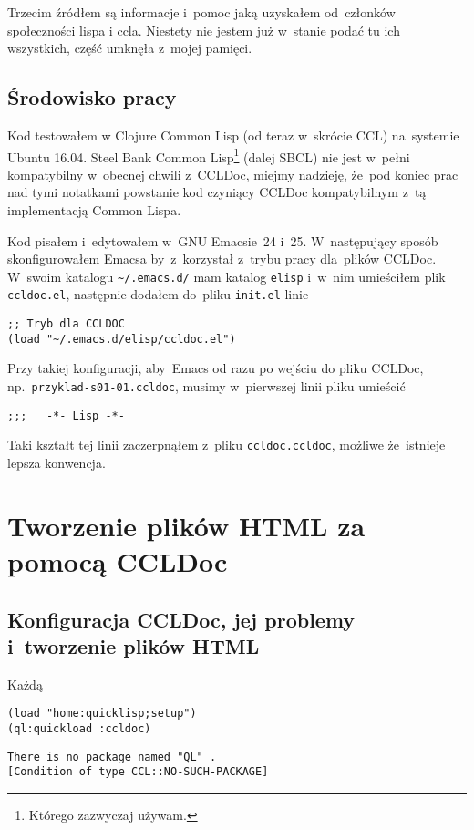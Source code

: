 \documentclass[a4paper,11pt]{article}  %
\begin{document}
Trzecim źródłem są informacje i~pomoc jaką uzyskałem od~członków
społeczności lispa i ccla. Niestety nie jestem już w~stanie podać tu
ich wszystkich, część umknęła z~mojej pamięci.





\subsection{Środowisko pracy}

Kod testowałem w Clojure Common Lisp (od teraz w~skrócie CCL)
na~systemie Ubuntu 16.04. Steel Bank Common Lisp\footnote{Którego
  zazwyczaj używam.} (dalej SBCL) nie jest w~pełni kompatybilny
w~obecnej chwili z~CCLDoc, miejmy nadzieję, że~pod koniec prac nad
tymi notatkami powstanie kod czyniący CCLDoc kompatybilnym z~tą
implementacją Common Lispa.

Kod pisałem i~edytowałem w~GNU Emacsie~24 i~25. W~następujący sposób
skonfigurowałem Emacsa by~z~korzystał z~trybu pracy dla~plików CCLDoc.
W~swoim katalogu \verb+~/.emacs.d/+ mam katalog \verb+elisp+ i~w~nim
umieściłem plik \verb+ccldoc.el+, następnie dodałem do~pliku
\verb+init.el+ linie
\begin{lstlisting}
;; Tryb dla CCLDOC
(load "~/.emacs.d/elisp/ccldoc.el")
\end{lstlisting}
Przy takiej konfiguracji, aby~Emacs od razu po wejściu do pliku
CCLDoc, np.~\verb+przyklad-s01-01.ccldoc+, musimy w~pierwszej linii
pliku umieścić
\begin{lstlisting}
;;;   -*- Lisp -*-
\end{lstlisting}
Taki kształt tej linii zaczerpnąłem z~pliku \verb+ccldoc.ccldoc+,
możliwe że~istnieje lepsza konwencja.





\section{Tworzenie plików HTML za pomocą CCLDoc}


\subsection{Konfiguracja CCLDoc, jej problemy i~tworzenie plików HTML}

Każdą
\begin{lstlisting}
(load "home:quicklisp;setup")
(ql:quickload :ccldoc)
\end{lstlisting}

\begin{lstlisting}
There is no package named "QL" .
[Condition of type CCL::NO-SUCH-PACKAGE]
\end{lstlisting}






\end{document}
